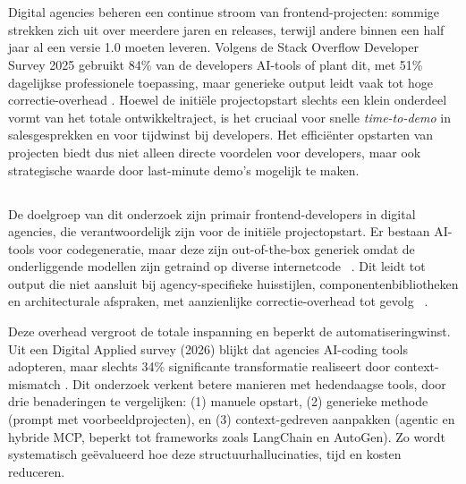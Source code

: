 \chapter{}
\label{ch:inleiding}

Digital agencies beheren een continue stroom van frontend-projecten: sommige strekken zich uit over meerdere jaren en releases, terwijl andere binnen een half jaar al een versie 1.0 moeten leveren. Volgens de Stack Overflow Developer Survey 2025 gebruikt 84\% van de developers AI-tools of plant dit, met 51\% dagelijkse professionele toepassing, maar generieke output leidt vaak tot hoge correctie-overhead \autocite{stackoverflow2025}. Hoewel de initi\"ele projectopstart slechts een klein onderdeel vormt van het totale ontwikkeltraject, is het cruciaal voor snelle \textit{time-to-demo} in salesgesprekken en voor tijdwinst bij developers. Het effici\"enter opstarten van projecten biedt dus niet alleen directe voordelen voor developers, maar ook strategische waarde door last-minute demo's mogelijk te maken.

\section{}
\label{sec:probleemstelling}

De doelgroep van dit onderzoek zijn primair frontend-developers in digital agencies, die verantwoordelijk zijn voor de initi\"ele projectopstart. Er bestaan AI-tools voor codegeneratie, maar deze zijn out-of-the-box generiek omdat de onderliggende modellen zijn getraind op diverse internetcode~ \autocite{Sergeyuk2024}. Dit leidt tot output die niet aansluit bij agency-specifieke huisstijlen, componentenbibliotheken en architecturale afspraken, met aanzienlijke correctie-overhead tot gevolg~ \autocite{Veracode2025}.

Deze overhead vergroot de totale inspanning en beperkt de automatiseringwinst. Uit een Digital Applied survey (2026) blijkt dat agencies AI-coding tools adopteren, maar slechts 34\% significante transformatie realiseert door context-mismatch \autocite{digitalapplied2026}. Dit onderzoek verkent betere manieren met hedendaagse tools, door drie benaderingen te vergelijken: (1) manuele opstart, (2) generieke methode (prompt met voorbeeldprojecten), en (3) context-gedreven aanpakken (agentic en hybride MCP, beperkt tot frameworks zoals LangChain en AutoGen). Zo wordt systematisch ge\"evalueerd hoe deze structuurhallucinaties, tijd en kosten reduceren.

